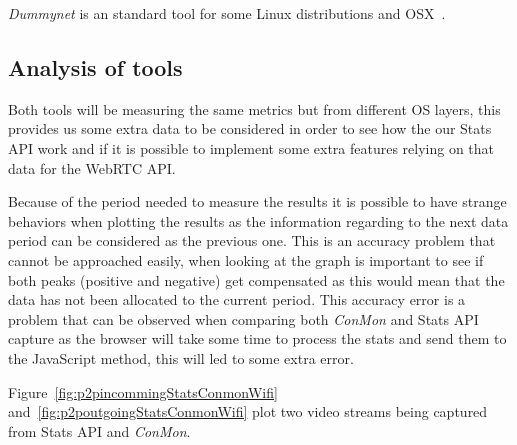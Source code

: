 {\it Dummynet} is an standard tool for some Linux distributions and OSX~\cite{dummynetTool}.

\subsection{Analysis of tools}

Both tools will be measuring the same metrics but from different OS layers, this provides us some extra data to be considered in order to see how the our Stats API work and if it is possible to implement some extra features relying on that data for the WebRTC API.

Because of the period needed to measure the results it is possible to have strange behaviors when plotting the results as the information regarding to the next data period can be considered as the previous one. This is an accuracy problem that cannot be approached easily, when looking at the graph is important to see if both peaks (positive and negative) get compensated as this would mean that the data has not been allocated to the current period. This accuracy error is a problem that can be observed when comparing both {\it ConMon} and Stats API capture as the browser will take some time to process the stats and send them to the JavaScript method, this will led to some extra error.

Figure~\ref{fig:p2pincommingStatsConmonWifi} and~\ref{fig:p2poutgoingStatsConmonWifi} plot two video streams being captured from Stats API and {\it ConMon}.

